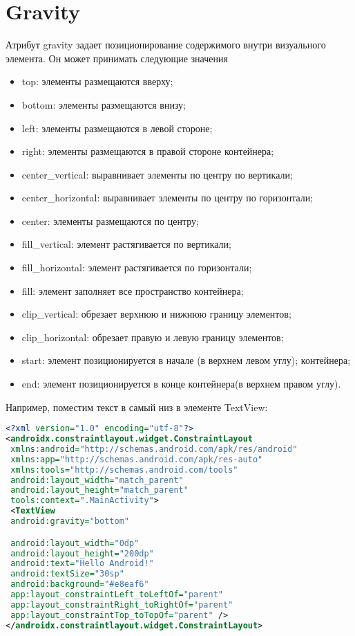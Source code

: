 \section{Gravity}
Атрибут gravity задает позиционирование содержимого внутри визуального
элемента. Он может принимать следующие значения
\begin{itemize}
    \item top: элементы размещаются вверху;
    \item bottom: элементы размещаются внизу;
    \item left: элементы размещаются в левой стороне;
    \item right: элементы размещаются в правой стороне контейнера;
    \item center\_vertical: выравнивает элементы по центру по вертикали;
    \item center\_horizontal: выравнивает элементы по центру по горизонтали;
    \item center: элементы размещаются по центру;
    \item fill\_vertical: элемент растягивается по вертикали;
    \item fill\_horizontal: элемент растягивается по горизонтали;
    \item fill: элемент заполняет все пространство контейнера;
    \item clip\_vertical: обрезает верхнюю и нижнюю границу элементов;
    \item clip\_horizontal: обрезает правую и левую границу элементов;
    \item start: элемент позиционируется в начале (в верхнем левом углу);
    контейнера;
    \item end: элемент позиционируется в конце контейнера(в верхнем правом
    углу).
\end{itemize}
Например, поместим текст в самый низ в элементе TextView:
\begin{lstlisting}[language=xml, caption=\leftline{xml}, label=lst:Gravity]
<?xml version="1.0" encoding="utf-8"?>
<androidx.constraintlayout.widget.ConstraintLayout
 xmlns:android="http://schemas.android.com/apk/res/android"
 xmlns:app="http://schemas.android.com/apk/res-auto"
 xmlns:tools="http://schemas.android.com/tools"
 android:layout_width="match_parent"
 android:layout_height="match_parent"
 tools:context=".MainActivity">
 <TextView
 android:gravity="bottom"

 android:layout_width="0dp"
 android:layout_height="200dp"
 android:text="Hello Android!"
 android:textSize="30sp"
 android:background="#e8eaf6"
 app:layout_constraintLeft_toLeftOf="parent"
 app:layout_constraintRight_toRightOf="parent"
 app:layout_constraintTop_toTopOf="parent" />
</androidx.constraintlayout.widget.ConstraintLayout>
\end{lstlisting}
